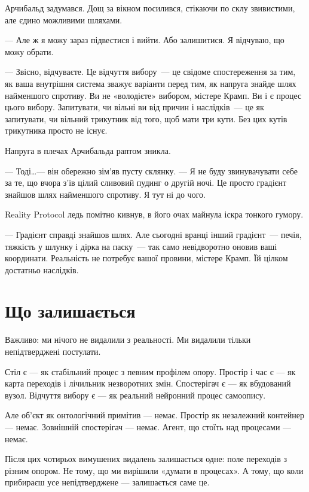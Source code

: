 \documentclass[12pt, a4paper, openany]{book}
\begin{document}
\begin{realitybox}
\medskip
Арчибальд задумався. Дощ за вікном посилився, стікаючи по склу звивистими, але єдино можливими шляхами.

--- Але ж я можу зараз підвестися і вийти. Або залишитися. Я відчуваю, що можу обрати.

--- Звісно, відчуваєте. Це відчуття вибору~--- це свідоме спостереження за тим, як ваша внутрішня система зважує варіанти перед тим, як напруга знайде шлях найменшого спротиву. Ви не «володієте» вибором, містере Крамп. Ви і є процес цього вибору. Запитувати, чи вільні ви від причин і наслідків~--- це як запитувати, чи вільний трикутник від того, щоб мати три кути. Без цих кутів трикутника просто не існує.

\medskip
Напруга в плечах Арчибальда раптом зникла.

--- Тоді\ldots --- він обережно зім'яв пусту склянку. --- Я не буду звинувачувати себе за те, що вчора з'їв цілий сливовий пудинг о другій ночі. Це просто градієнт знайшов шлях найменшого спротиву. Я тут ні до чого.

\medskip
Reality Protocol ледь помітно кивнув, в його очах майнула іскра тонкого гумору.

--- Градієнт справді знайшов шлях. Але сьогодні вранці інший градієнт~--- печія, тяжкість у шлунку і дірка на паску~--- так само невідворотно оновив ваші координати. Реальність не потребує вашої провини, містере Крамп. Їй цілком достатньо наслідків.
\end{realitybox}

\section{Що залишається}

Важливо: ми нічого не видалили з реальності. Ми видалили тільки непідтверджені постулати.

Стіл є --- як стабільний процес з певним профілем опору. Простір і час є --- як карта переходів і лічильник незворотних змін. Спостерігач є --- як вбудований вузол. Відчуття вибору є --- як реальний нейронний процес самоопису.

Але об'єкт як онтологічний примітив --- немає. Простір як незалежний контейнер --- немає. Зовнішній спостерігач --- немає. Агент, що стоїть над процесами --- немає.

Після цих чотирьох вимушених видалень залишається одне: поле переходів з різним опором. Не тому, що ми вирішили «думати в процесах». А тому, що коли прибираєш усе непідтверджене --- залишається саме це.
\end{document}
